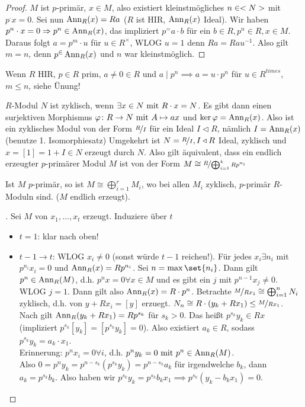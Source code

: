 \begin{proof}
	$M$ ist $p$-primär, $x \in M$, also existiert kleinstmögliches $n \in \N$ mit $p^ \cdot x = 0$. Sei nun $\Ann_R(x) = Ra$ ($R$ ist HIR, $\Ann_R(x)$ Ideal). Wir haben $p^n \cdot x = 0 \implies p^n \in \Ann_R(x)$, das impliziert $p^ = a\cdot b$ für ein $b \in R, p^n \in R, x \in M$. Daraus folgt $a = p^m\cdot u$ für $u \in R^{\times}$, WLOG $u=1$ denn $Ra = Ra u^{-1}$. Also gilt $m=n$, denn $p^ \in \Ann_R(x)$ und $n$ war kleinstmöglich.
\end{proof}
Wenn $R$ HIR, $p\in R$ prim, $a \neq 0 \in R$ und $a \mid p^n \implies a = u\cdot p^n$ für $u \in R^{times}$, $m \le n$, siehe Ünung!
\begin{erinnerung}
	$R$-Modul $N$ ist zyklisch, wenn $\exists x \in N \mit R\cdot x = N$. Es gibt dann einen surjektiven Morphismus $\phi\colon R \to N \mit A \mapsto ax$ und $\ker \phi = \Ann_R(x)$. Also ist ein zyklisches Modul von der Form $\lnkset{R}{I}$ für ein Ideal  $I \lhd R$, nämlich $I = \Ann_R(x)$ (benutze 1. Isomorphiesatz) %
	Umgekehrt ist $N = \lnkset{R}{I}, I \lhd R$ Ideal, zyklisch und $x = [1] = 1 + I \in N$ erzeugt durch $N$. Also gilt äquivalent, dass ein endlich erzeugter $p$-primärer Modul $M$ ist von der Form $M \cong \lnkset{R}{\bigoplus_{i=1}^k Rp^{n_i}}$
\end{erinnerung}
\begin{proposition}
	Ist $M$ $p$-primär, so ist $M \cong \bigoplus_{i=1}^r M_i$, wo bei allen $M_i$ zyklisch, $p$-primär $R$-Moduln sind. ($M$ endlich erzeugt).
\end{proposition}
\begin{proof}[]
	Sei $M$ von $x_1, \dots, x_t$ erzeugt. Induziere über $t$
	\begin{itemize}
		\item $t = 1$: klar nach oben!
		\item $t -1 \to t$: WLOG $x_i \neq 0$ (sonst würde $t-1$ reichen!). Für jedes $x_i \exists n_i$ mit $p^{n_i} x_i= 0$ und $\Ann_R(x) = Rp^{n_i}$. Sei $n = \max\set{n_i}$. Dann gilt $p^n \in \Ann_R(M)$, d.h. $p^n x = 0\forall x \in M$ und es gibt ein $j$ mit $p^{n-1} x_j \neq 0$. WLOG $j=1$. Dann gilt also $\Ann_R(x) = R\cdot p^n$. Betrachte $\lnkset{M}{R x_1} \cong \bigoplus_{i=1}^n N_i$ zyklisch, d.h. von $y + Rx_i = [y]$ erzuegt. $N_n \cong R\cdot (y_k + R x_1) \le \lnkset{M}{R x_1}$. Nach  gilt $\Ann_R(y_k + Rx_1) = Rp^{s_k}$ für $s_k > 0$. Das heißt $p^{s_k} y_k \in Rx$ (impliziert $p^{s_k}[y_k] = [p^{s_k}y_k] = 0$). Also existiert $a_k \in R$, sodass $p^{s_k} y_k = a_k \cdot x_1$.\\
		Erinnerung: $p^n x_i = 0 \forall i$, d.h. $p^n y_k = 0 \mit p^n \in \Ann_R(M)$.\\
		Also $0 = p^n y_k = p^{n-s_k}(p^{s_k}y_k) = p^{n-s_k}a_k$ für irgendwelche $b_k$, dann $a_k = p^{s_k}b_k$. Also haben wir $p^{s_k}y_k = p^{s_k} b_k x_1 \implies p^{s_k}(y_k-b_k x_1) = 0$.
	\end{itemize}
\end{proof}
